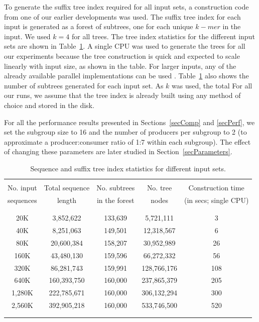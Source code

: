 \documentclass[10pt,journal,letterpaper,compsoc]{IEEEtran}
\def\colrule{\\[-7pt]\hline\\[-6pt]}
\begin{document}
To generate the suffix tree index required for all input sets, a construction code from one of our earlier developments \cite{KalyanaramanJPDC07} was used. The suffix tree index for each input is generated as a forest of subtrees, one for each unique $k-mer$ in the input. We used $k=4$ for all trees. The tree index statistics for the different input sets are shown in Table~\ref{tabInputTrees}. A single CPU was used to generate the trees for all our experiments because the tree construction is quick and expected to scale linearly with input size, as shown in the table. For larger inputs, any of the already available parallel implementations can be used \cite{Ghoting09,KalyanaramanJPDC07}. Table~\ref{tabInputTrees} also shows the number of subtrees generated for each input set. As $k$ was used, the total   For all our runs, we assume that the tree index is already built using any method of choice and stored in the disk.

For all the performance results presented in Sections~\ref{secComp} and \ref{secPerf}, we set the subgroup size to 16 and the number of producers per subgroup to 2 (to approximate a producer:consumer ratio of 1:7 within each subgroup). The effect of changing these parameters are later studied in Section~\ref{secParameters}.

\begin{table}[thb]
\begin{center}
\begin{tabular}{c|c|c|c|c|}
\colrule
No. input  & Total sequence & No. subtrees& No. tree & Construction time  \\
sequences & length & in the forest & nodes & (in secs; single CPU) \\
 \colrule
 20K & 3,852,622 & 133,639 & 5,721,111 & 3\\
 40K & 8,251,063 & 149,501 & 12,318,567 & 6 \\
 80K & 20,600,384 & 158,207 & 30,952,989 & 26\\
 160K & 43,480,130 & 159,596 & 66,272,332 & 56\\
 320K & 86,281,743 & 159,991 & 128,766,176 & 108\\
 640K & 160,393,750 & 160,000 & 237,865,379 & 205\\
 1,280K & 222,785,671 & 160,000 & 306,132,294 & 300\\
 2,560K& 392,905,218 & 160,000 & 533,746,500 & 520\\
\colrule
\end{tabular}
\end{center}
\caption{\label{tabInputTrees}
Sequence and suffix tree index statistics for different input sets.
}
\end{table}
\end{document}
